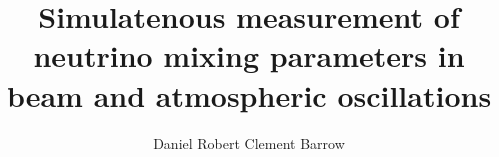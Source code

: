 \documentclass[hyperpdf,bindnopdf,alphafoot]{hepthesis}
\title{Simulatenous measurement of neutrino mixing parameters in beam and atmospheric oscillations}
\author{Daniel Robert Clement Barrow}
\begin{document}
\begin{frontmatter}
  
\end{frontmatter}

\begin{mainmatter}
  
  
  
  
  
\end{mainmatter}

\begin{appendices}
  
\end{appendices}

\begin{backmatter}
  
\end{backmatter}

\end{document}
